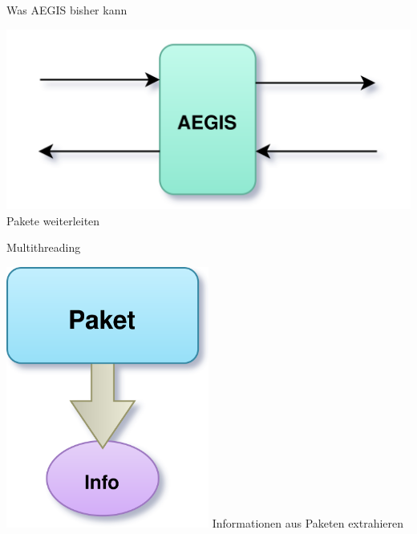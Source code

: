 \documentclass{beamer}
\begin{document}
\begin{frame}{Was AEGIS bisher kann}
    \begin{minipage}[h]{\textwidth}
        \center
        \begin{minipage}[h]{0.5\textwidth}
            \center
            \includegraphics[width=\textwidth]{done/done1.png}
            Pakete weiterleiten
        \end{minipage}
        \begin{minipage}[h]{0.25\textwidth}
            \center
            Multithreading
        \end{minipage}
    \end{minipage}
    \vspace{0.5cm}
    \begin{minipage}[h]{\textwidth}
        \center
        \begin{minipage}[h]{0.3\textwidth}
            \center
            \includegraphics[width=0.5\textwidth]{done/done3.png}
            Informationen aus Paketen extrahieren
        \end{minipage}
    \end{minipage}
\end{frame}
\end{document}
